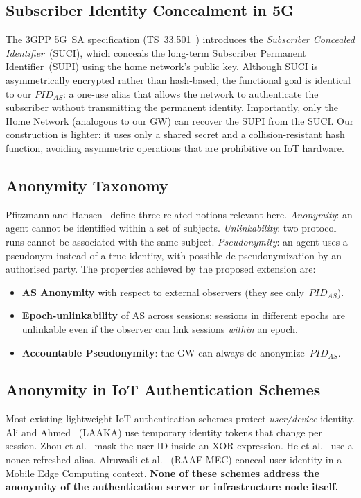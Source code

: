 \documentclass[12pt,a4paper]{article}
\newcommand{\PIDas}{\mathit{PID}_{AS}}
\begin{document}
\subsection{Subscriber Identity Concealment in 5G}

The 3GPP 5G~SA specification (TS~33.501~\cite{3gpp33501}) introduces
the \emph{Subscriber Concealed Identifier}~(SUCI), which conceals the
long-term Subscriber Permanent Identifier~(SUPI) using the home network's
public key.
Although SUCI is asymmetrically encrypted rather than hash-based, the
functional goal is identical to our $\PIDas$: a one-use alias that
allows the network to authenticate the subscriber without transmitting
the permanent identity.
Importantly, only the Home Network (analogous to our GW) can recover
the SUPI from the SUCI.
Our construction is lighter: it uses only a shared secret and a
collision-resistant hash function, avoiding asymmetric operations that
are prohibitive on IoT hardware.

\subsection{Anonymity Taxonomy}

Pfitzmann and Hansen~\cite{pfitzmann2010terminology} define three
related notions relevant here.
\emph{Anonymity}: an agent cannot be identified within a set of
subjects.
\emph{Unlinkability}: two protocol runs cannot be associated with the
same subject.
\emph{Pseudonymity}: an agent uses a pseudonym instead of a true
identity, with possible de-pseudonymization by an authorised party.
The properties achieved by the proposed extension are:
\begin{itemize}
  \item \textbf{AS Anonymity} with respect to external observers
        (they see only~$\PIDas$).
  \item \textbf{Epoch-unlinkability} of AS across sessions: sessions
        in different epochs are unlinkable even if the observer can
        link sessions \emph{within} an epoch.
  \item \textbf{Accountable Pseudonymity}: the GW can always
        de-anonymize~$\PIDas$.
\end{itemize}

\subsection{Anonymity in IoT Authentication Schemes}

Most existing lightweight IoT authentication schemes protect
\emph{user/device} identity.
Ali and Ahmed~\cite{ali2024laaka} (LAAKA) use temporary identity tokens
that change per session.
Zhou et al.~\cite{zhou2024auth} mask the user ID inside an XOR expression.
He et al.~\cite{he2023lightweight} use a nonce-refreshed alias.
Alruwaili et al.~\cite{alruwaili2025raaf} (RAAF-MEC) conceal user
identity in a Mobile Edge Computing context.
\textbf{None of these schemes address the anonymity of the
authentication server or infrastructure node itself.}
\end{document}
